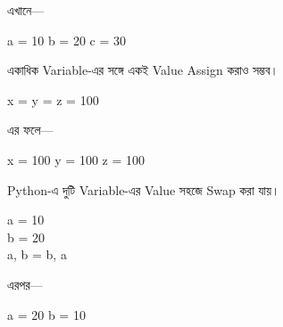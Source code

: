 এখানে—

\begin{center}

\textenglish{\ttfamily a = 10}
\qquad
\textenglish{\ttfamily b = 20}
\qquad
\textenglish{\ttfamily c = 30}

\end{center}



একাধিক Variable-এর সঙ্গে একই Value Assign করাও সম্ভব।

\begin{codebox}

\begin{english}
\ttfamily
x = y = z = 100
\end{english}

\end{codebox}

এর ফলে—

\begin{center}

\textenglish{\ttfamily x = 100}
\qquad
\textenglish{\ttfamily y = 100}
\qquad
\textenglish{\ttfamily z = 100}

\end{center}



Python-এ দুটি Variable-এর Value সহজে Swap করা যায়।

\begin{codebox}

\begin{english}
\ttfamily
a = 10\\
b = 20\\[1mm]
a, b = b, a
\end{english}

\end{codebox}

এরপর—

\begin{center}

\textenglish{\ttfamily a = 20}
\qquad
\textenglish{\ttfamily b = 10}

\end{center}

